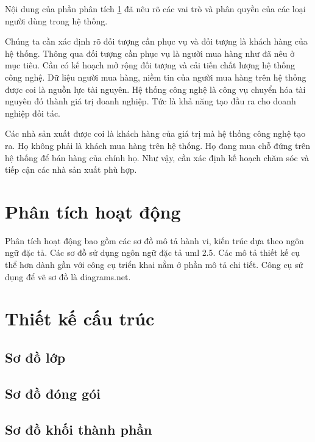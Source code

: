 \documentclass[11pt]{report}
\begin{document}
Nội dung của phần phân tích \ref{section:readme} đã nêu rõ các vai trò và phân quyền của các loại người dùng trong hệ thống.

Chúng ta cần xác định rõ đối tượng cần phục vụ và đối tượng là khách hàng của hệ thống. Thông qua đối tượng cần phục vụ là người mua hàng như đã nêu ở mục tiêu. Cần có kế hoạch mở rộng đối tượng và cải tiến chất lượng hệ thống công nghệ. Dữ liệu người mua hàng, niềm tin của người mua hàng trên hệ thống được coi là nguồn lực tài nguyên. Hệ thống công nghệ là công vụ chuyển hóa tài nguyên đó thành giá trị doanh nghiệp. Tức là khả năng tạo đầu ra cho doanh nghiệp đối tác.

Các nhà sản xuất được coi là khách hàng của giá trị mà hệ thống công nghệ tạo ra. Họ không phải là khách mua hàng trên hệ thống. Họ đang mua chỗ đứng trên hệ thống để bán hàng của chính họ. Như vậy, cần xác định kế hoạch chăm sóc và tiếp cận các nhà sản xuất phù hợp.




\section{Phân tích hoạt động}\label{section:readme}
Phân tích hoạt động bao gồm các sơ đồ mô tả hành vi, kiến trúc dựa theo ngôn ngữ đặc tả. Các sơ đồ sử dụng ngôn ngữ đặc tả \acrshort{uml} 2.5. Các mô tả thiết kế cụ thể hơn dành gần với công cụ triển khai nằm ở phần mô tả chi tiết. Công cụ sử dụng để vẽ sơ đồ là diagrams.net.




\section{Thiết kế cấu trúc}\label{section:design}

\subsection{Sơ đồ lớp}


\subsection{Sơ đồ đóng gói}


\subsection{Sơ đồ khối thành phần}

\end{document}
